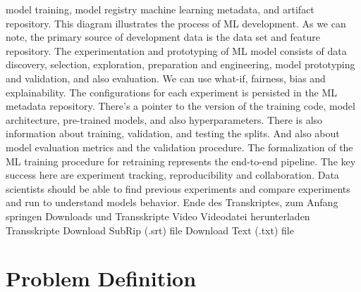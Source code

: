     model training, model registry machine learning metadata,
    and artifact repository.
    This diagram illustrates the process of ML development.
    As we can note, the primary source of development data
    is the data set and feature repository.
    The experimentation and prototyping of ML model
    consists of data discovery, selection, exploration, preparation
    and engineering, model prototyping and validation, and also evaluation.
    We can use what-if, fairness, bias and explainability.
    The configurations for each experiment is persisted in the ML metadata
    repository.
    There's a pointer to the version of the training code, model architecture,
    pre-trained models, and also hyperparameters.
    There is also information about training, validation, and testing
    the splits.
    And also about model evaluation metrics and the validation procedure.
    The formalization of the ML training procedure for retraining
    represents the end-to-end pipeline.
    The key success here are experiment tracking, reproducibility
    and collaboration.
    Data scientists should be able to find previous experiments
    and compare experiments and run to understand models behavior.
    Ende des Transkriptes, zum Anfang springen
    Downloads und Transskripte
    Video
    Videodatei herunterladen
    Transskripte
    Download SubRip (.srt) file
    Download Text (.txt) file
    
    
\section{Problem Definition}

